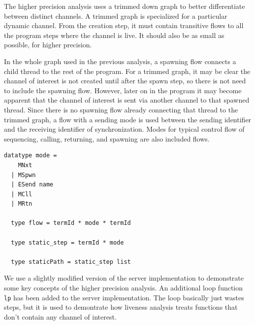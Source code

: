 \documentclass[letterpaper, 11pt]{extarticle}
\begin{document}
The higher precision analysis uses a trimmed down graph to better differentiate between distinct channels. 
A trimmed graph is specialized for a particular dynamic channel.  From the creation
step, it must contain transitive flows to all the program steps where the
channel is live. It should also be as small as possible, for higher precision.

In the whole graph used in the previous analysis, a spawning flow
connects a child thread to the rest of the program.  For a trimmed graph,
it may be clear the channel of interest is not created until after the spawn step,
so there is not need to include the spawning flow.  However, later on in the
program it may become apparent that the channel of interest is sent via another channel to
that spawned thread.  Since there is no spawning flow already connecting that
thread to the trimmed graph, a flow with a sending mode is used between the
sending identifier and the receiving identifier of synchronization.
Modes for typical control flow of
sequencing, calling, returning, and spawning are also included flows.

\begin{lstlisting}[language=logic, mathescape]
  datatype mode =
    MNxt
  | MSpwn
  | ESend name
  | MCll
  | MRtn

  type flow = termId * mode * termId

  type static_step = termId * mode

  type staticPath = static_step list
\end{lstlisting}

We use a slightly modified version of the server implementation
to demonstrate some key concepts of the higher precision analysis.
An additional loop function \lstinline{lp} has been added to the
server implementation. The loop basically just wastes steps, but it is used to demontrate how
liveness analysis treats functions that don't contain any channel of interest.
\end{document}
